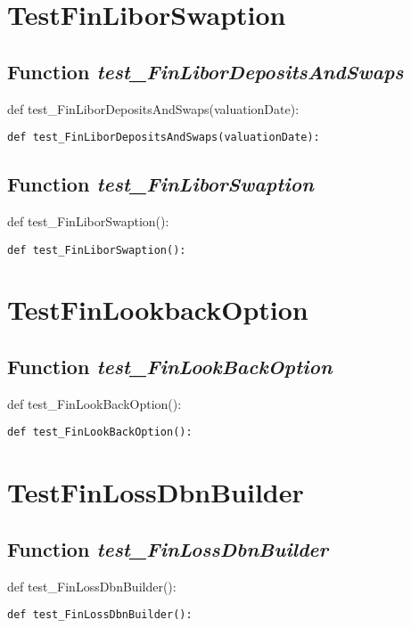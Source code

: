 \documentclass[twoside,11pt]{book}
\begin{document}
\newpage
\section{TestFinLiborSwaption}

\subsection{Function {\it test\_FinLiborDepositsAndSwaps}}
def test\_FinLiborDepositsAndSwaps(valuationDate):

\begin{lstlisting}
def test_FinLiborDepositsAndSwaps(valuationDate):
\end{lstlisting}

\subsection{Function {\it test\_FinLiborSwaption}}
def test\_FinLiborSwaption():

\begin{lstlisting}
def test_FinLiborSwaption():
\end{lstlisting}


\newpage
\section{TestFinLookbackOption}

\subsection{Function {\it test\_FinLookBackOption}}
def test\_FinLookBackOption():

\begin{lstlisting}
def test_FinLookBackOption():
\end{lstlisting}


\newpage
\section{TestFinLossDbnBuilder}

\subsection{Function {\it test\_FinLossDbnBuilder}}
def test\_FinLossDbnBuilder():

\begin{lstlisting}
def test_FinLossDbnBuilder():
\end{lstlisting}
\end{document}
